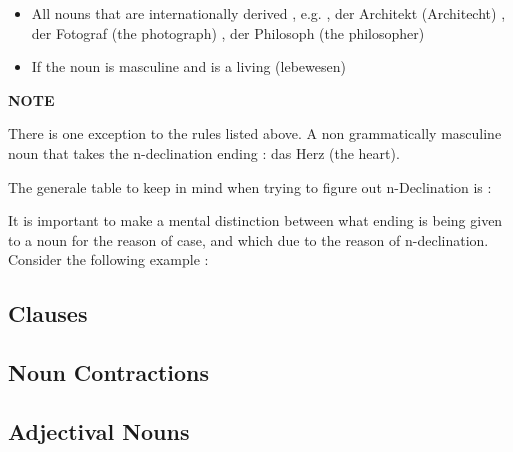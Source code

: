 \documentclass[a4paper,twocolumn,10pt]{article}
\newcommand{\newpar}
{\par \vspace{0.3cm}}
\newcommand{\subsectionend}
{
\nolinenumbers
\linenumbers
}
\newcommand{\tcolorboxstart}
{
	\nolinenumbers
	\vspace{0.2cm}
	\centering
}
\newcommand{\tcolorboxend}
{
	\justifying
	\vspace{0.2cm}
	\linenumbers
}
\newcommand{\tcolorboxnote}[1]
{

\tcolorboxstart
\begin{note-bg}

	\begin{note-theword}
		{\footnotesize \textbf{NOTE} }
	\end{note-theword}

	\begin{note-content} \justifying

		#1

	\end{note-content}

\end{note-bg}
\tcolorboxend
}
\begin{document}
\begin{itemize}[noitemsep]
	\item All nouns that are internationally derived , e.g. , der Architekt
		(Architecht) , der Fotograf (the photograph) , der Philosoph (the
		philosopher)

		
	\item If the noun is masculine and is a living (lebewesen) 
\end{itemize}
\linenumbers



\tcolorboxnote
{
There is one exception to the rules listed above. A non grammatically masculine
noun that takes the n-declination ending : das Herz (the heart).
}









The generale table to keep in mind when trying to figure out n-Declination is
:\newpar







It is important to make a mental distinction between what ending is being given
to a noun for the reason of case, and which due to the reason of
n-declination. Consider the following example : \newpar




\subsectionend

\subsection{Clauses}
\label{ssec:clauses}


\subsectionend

\subsection{Noun Contractions}
\label{ssec:noun_contractions}


\subsectionend

\subsection{Adjectival Nouns}
\label{ssec:adjectival_nouns}
\end{document}
